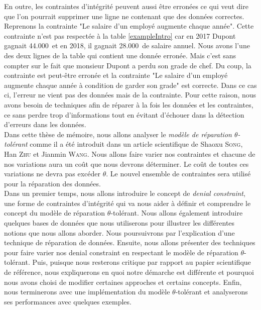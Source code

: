 \documentclass[letterpaper, 12pt]{report}
\theoremstyle{definition}
\begin{document}
En outre, les contraintes d'intégrité peuvent aussi être erronées ce qui veut dire que l'on pourrait supprimer une ligne ne contenant que des données correctes. Reprenons la contrainte "Le salaire d'un employé augmente chaque année". Cette contrainte n'est pas respectée à la table \ref{exampleIntro} car en 2017 Dupont gagnait 44.000\texteuro\, et en 2018, il gagnait 28.000\texteuro\,  de salaire annuel. Nous avons l'une des deux lignes de la table qui contient une donnée erronée. Mais c'est sans compter sur le fait que monsieur Dupont a perdu son grade de chef. Du coup, la contrainte est peut-être erronée et la contrainte "Le salaire d'un employé augmente chaque année à condition de garder son grade" est correcte. Dans ce cas ci, l'erreur ne vient pas des données mais de la contrainte. Pour cette raison, nous avons besoin de techniques afin de réparer à la fois les données et les contraintes, ce sans perdre trop d'informations tout en évitant d'échouer dans la détection d'erreurs dans les données.\\

Dans cette thèse de mémoire, nous allons analyser le \emph{modèle de réparation $\theta$-tolérant} comme il a été introduit dans un article scientifique de Shaoxu \textsc{Song}, Han \textsc{Zhu} et Jianmin \textsc{Wang}\cite{main}. Nous allons faire varier nos contraintes et chacune de nos variations aura un coût que nous devrons déterminer. Le coût de toutes ces variations ne devra pas excéder $\theta$. Le nouvel ensemble de contraintes sera utilisé pour la réparation des données.\\

Dans un premier temps, nous allons introduire le concept de \emph{denial constraint}, une forme de contraintes d'intégrité qui va nous aider à définir et comprendre le concept du modèle de réparation $\theta$-tolérant. Nous allons également introduire quelques bases de données que nous utiliserons pour illustrer les différentes notions que nous allons aborder. Nous poursuivrons par l'explication d'une technique de réparation de données. Ensuite, nous allons présenter des techniques pour faire varier nos denial constraint en respectant le modèle de réparation $\theta$-tolérant. Puis, puisque nous resterons critique par rapport au papier scientifique de référence, nous expliquerons en quoi notre démarche est différente et pourquoi nous avons choisi de modifier certaines approches et certains concepts. Enfin, nous terminerons avec une implémentation du modèle $\theta$-tolérant et analyserons ses performances avec quelques exemples.
\end{document}
